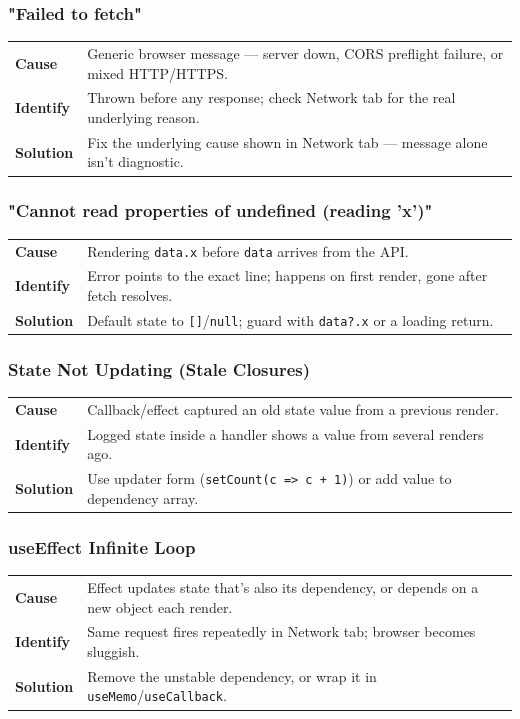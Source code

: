\subsubsection*{"Failed to fetch"}
\noindent\begin{tabularx}{\textwidth}{@{}>{\bfseries}p{2.3cm}X@{}}
\toprule
Cause & Generic browser message --- server down, CORS preflight failure, or mixed HTTP/HTTPS. \\
Identify & Thrown before any response; check Network tab for the real underlying reason. \\
Solution & Fix the underlying cause shown in Network tab --- message alone isn't diagnostic. \\
\bottomrule
\end{tabularx}

\subsubsection*{"Cannot read properties of undefined (reading 'x')"}
\noindent\begin{tabularx}{\textwidth}{@{}>{\bfseries}p{2.3cm}X@{}}
\toprule
Cause & Rendering \texttt{data.x} before \texttt{data} arrives from the API. \\
Identify & Error points to the exact line; happens on first render, gone after fetch resolves. \\
Solution & Default state to \texttt{[]}/\texttt{null}; guard with \texttt{data?.x} or a loading return. \\
\bottomrule
\end{tabularx}

\subsubsection*{State Not Updating (Stale Closures)}
\noindent\begin{tabularx}{\textwidth}{@{}>{\bfseries}p{2.3cm}X@{}}
\toprule
Cause & Callback/effect captured an old state value from a previous render. \\
Identify & Logged state inside a handler shows a value from several renders ago. \\
Solution & Use updater form (\texttt{setCount(c => c + 1)}) or add value to dependency array. \\
\bottomrule
\end{tabularx}

\subsubsection*{useEffect Infinite Loop}
\noindent\begin{tabularx}{\textwidth}{@{}>{\bfseries}p{2.3cm}X@{}}
\toprule
Cause & Effect updates state that's also its dependency, or depends on a new object each render. \\
Identify & Same request fires repeatedly in Network tab; browser becomes sluggish. \\
Solution & Remove the unstable dependency, or wrap it in \texttt{useMemo}/\texttt{useCallback}. \\
\bottomrule
\end{tabularx}

